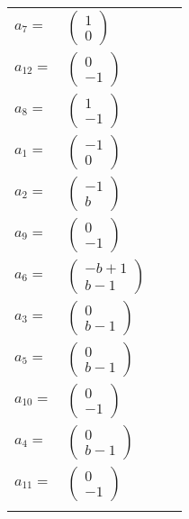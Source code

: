 \documentclass[1p]{elsarticle_modified}
\theoremstyle{definition}
\begin{document}
\begin{tabular}{m{7pt} m{180pt} m{7pt} m{180pt} }
\flushright $a_{7}=$&$\begin{pmatrix}1\\0\end{pmatrix}$ \\
\flushright $a_{12}=$&$\begin{pmatrix}0\\-1\end{pmatrix}$ \\
\flushright $a_{8}=$&$\begin{pmatrix}1\\-1\end{pmatrix}$ \\
\flushright $a_{1}=$&$\begin{pmatrix}-1\\0\end{pmatrix}$ \\
\flushright $a_{2}=$&$\begin{pmatrix}-1\\b\end{pmatrix}$ \\
\flushright $a_{9}=$&$\begin{pmatrix}0\\-1\end{pmatrix}$ \\
\flushright $a_{6}=$&$\begin{pmatrix}- b+1\\b-1\end{pmatrix}$ \\
\flushright $a_{3}=$&$\begin{pmatrix}0\\b-1\end{pmatrix}$ \\
\flushright $a_{5}=$&$\begin{pmatrix}0\\b-1\end{pmatrix}$ \\
\flushright $a_{10}=$&$\begin{pmatrix}0\\-1\end{pmatrix}$ \\
\flushright $a_{4}=$&$\begin{pmatrix}0\\b-1\end{pmatrix}$ \\
\flushright $a_{11}=$&$\begin{pmatrix}0\\-1\end{pmatrix}$\\&\end{tabular}
\end{document}
